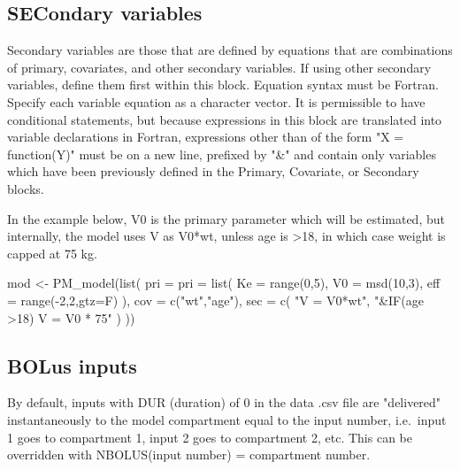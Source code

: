 \documentclass[
]{book}
\newenvironment{Shaded}{\begin{snugshade}}{\end{snugshade}}
\newcommand{\AttributeTok}[1]{\textcolor[rgb]{0.77,0.63,0.00}{#1}}
\newcommand{\DecValTok}[1]{\textcolor[rgb]{0.00,0.00,0.81}{#1}}
\newcommand{\FunctionTok}[1]{\textcolor[rgb]{0.00,0.00,0.00}{#1}}
\newcommand{\NormalTok}[1]{#1}
\newcommand{\OtherTok}[1]{\textcolor[rgb]{0.56,0.35,0.01}{#1}}
\newcommand{\SpecialCharTok}[1]{\textcolor[rgb]{0.00,0.00,0.00}{#1}}
\newcommand{\StringTok}[1]{\textcolor[rgb]{0.31,0.60,0.02}{#1}}
\begin{document}
\hypertarget{secR6}{%
\subsection{SECondary variables}\label{secR6}}

Secondary variables are those that are defined by equations that are
combinations of primary, covariates, and other secondary variables. If
using other secondary variables, define them first within this block.
Equation syntax must be Fortran. Specify each variable equation as a character vector. It is permissible to have conditional
statements, but because expressions in this block are translated into
variable declarations in Fortran, expressions other than of the form "X = function(Y)" must be on a new line, prefixed by "\&" and contain only variables which have been previously defined in the Primary, Covariate, or Secondary blocks.

In the example below, V0 is the primary parameter which will be estimated, but internally, the model uses V as V0*wt, unless age is \textgreater18, in which case weight is capped at 75 kg.

\begin{Shaded}
\begin{Highlighting}[]
\NormalTok{mod }\OtherTok{\textless{}{-}} \FunctionTok{PM\_model}\NormalTok{(}\FunctionTok{list}\NormalTok{(}
  \AttributeTok{pri =} \AttributeTok{pri =} \FunctionTok{list}\NormalTok{(}
    \AttributeTok{Ke =} \FunctionTok{range}\NormalTok{(}\DecValTok{0}\NormalTok{,}\DecValTok{5}\NormalTok{),}
    \AttributeTok{V0 =} \FunctionTok{msd}\NormalTok{(}\DecValTok{10}\NormalTok{,}\DecValTok{3}\NormalTok{),}
    \AttributeTok{eff =} \FunctionTok{range}\NormalTok{(}\SpecialCharTok{{-}}\DecValTok{2}\NormalTok{,}\DecValTok{2}\NormalTok{,}\AttributeTok{gtz=}\NormalTok{F)}
\NormalTok{  ),}
  \AttributeTok{cov =} \FunctionTok{c}\NormalTok{(}\StringTok{"wt"}\NormalTok{,}\StringTok{"age"}\NormalTok{),}
  \AttributeTok{sec =} \FunctionTok{c}\NormalTok{(}
    \StringTok{"V = V0*wt"}\NormalTok{,}
    \StringTok{"\&IF(age \textgreater{}18) V = V0 * 75"}
\NormalTok{  )}
\NormalTok{))}
\end{Highlighting}
\end{Shaded}

\hypertarget{bolR6}{%
\subsection{BOLus inputs}\label{bolR6}}

By default, inputs with DUR (duration) of 0 in the data .csv file are
"delivered" instantaneously to the model compartment equal to the
input number, i.e.~input 1 goes to compartment 1, input 2 goes to
compartment 2, etc. This can be overridden with NBOLUS(input number) =
compartment number.
\end{document}
